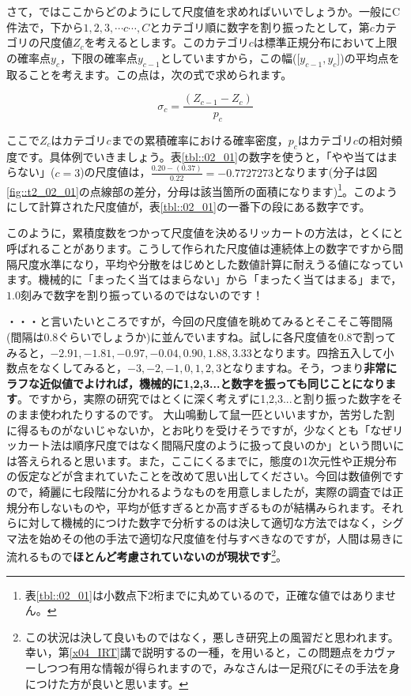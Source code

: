 \documentclass{ltjsbook}
\begin{document}
さて，ではここからどのようにして尺度値を求めればいいでしょうか。一般にC件法で，下から$1,2,3,\cdots c\cdots, C$とカテゴリ順に数字を割り振ったとして，第$c$カテゴリの尺度値$Z_c$を考えるとします。このカテゴリ$c$は標準正規分布において上限の確率点$y_c$，下限の確率点$y_{c-1}$としていますから，この幅([$y_{c-1} , y_c$])の平均点を取ることを考えます。この点は，次の式で求められます。

\[ \sigma_c = \frac{(Z_{c-1} - Z_{c})}{p_c} \]

ここで$Z_c$はカテゴリ$c$までの累積確率における確率密度，$p_c$はカテゴリ$c$の相対頻度です。具体例でいきましょう。表\ref{tbl::02_01}の数字を使うと，「やや当てはまらない」($c=3$)の尺度値は，$\frac{0.20-(0.37)}{0.22}=-0.7727273$となります(分子は図\ref{fig::t2_02_01}の点線部の差分，分母は該当箇所の面積になります)\footnote{表\ref{tbl::02_01}は小数点下2桁までに丸めているので，正確な値ではありません。}。このようにして計算された尺度値が，表\ref{tbl::02_01}の一番下の段にある数字です。

このように，累積度数をつかって尺度値を決めるリッカートの方法は，とくにと呼ばれることがあります。こうして作られた尺度値は連続体上の数字ですから間隔尺度水準になり，平均や分散をはじめとした数値計算に耐えうる値になっています。機械的に「まったく当てはまらない」から「まったく当てはまる」まで，$1.0$刻みで数字を割り振っているのではないのです！


・・・と言いたいところですが，今回の尺度値を眺めてみるとそこそこ等間隔(間隔は$0.8$ぐらいでしょうか)に並んでいますね。試しに各尺度値を0.8で割ってみると，$-2.91,-1.81,-0.97, -0.04,0.90, 1.88, 3.33$となります。四捨五入して小数点をなくしてみると，$-3,-2,-1,0,1,2,3$となりますね。そう，つまり\textbf{非常にラフな近似値でよければ，機械的に1,2,3...と数字を振っても同じことになります}。ですから，実際の研究ではとくに深く考えずに1,2,3...と割り振った数字をそのまま使われたりするのです。
大山鳴動して鼠一匹といいますか，苦労した割に得るものがないじゃないか，とお叱りを受けそうですが，少なくとも「なぜリッカート法は順序尺度ではなく間隔尺度のように扱って良いのか」という問いには答えられると思います。また，ここにくるまでに，態度の1次元性や正規分布の仮定などが含まれていたことを改めて思い出してください。今回は数値例ですので，綺麗に七段階に分かれるようなものを用意しましたが，実際の調査では正規分布しないものや，平均が低すぎるとか高すぎるものが結構みられます。それらに対して機械的につけた数字で分析するのは決して適切な方法ではなく，シグマ法を始めその他の手法で適切な尺度値を付与すべきなのですが，人間は易きに流れるもので\textbf{ほとんど考慮されていないのが現状です}\footnote{この状況は決して良いものではなく，悪しき研究上の風習だと思われます。幸い，第\ref{x04_IRT}講で説明するの一種，を用いると，この問題点をカヴァーしつつ有用な情報が得られますので，みなさんは一足飛びにその手法を身につけた方が良いと思います。}。
\end{document}
